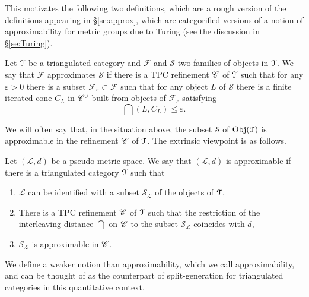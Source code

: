This motivates the following two definitions, which are a rough version of the definitions appearing in \S\ref{se:approx}, which are categorified versions of a notion of approximability for metric groups due to Turing \cite{Turing:approx} (see the discussion in \S\ref{se:Turing}).
\begin{dfn}
    Let $\mathcal{T}$ be a triangulated category and $\mathcal{F}$ and $\mathcal{S}$ two families of objects in $\mathcal{T}$. We say that $\mathcal{F}$ approximates $\mathcal{S}$ if there is a TPC refinement ${\mathscr{C}}$ of $\mathcal{T}$ such that for any $\varepsilon>0$ there is a  subset $\mathcal{F}_\varepsilon\subset \mathcal{F}$ such that for any object $L$ of $\mathcal{S}$ there is a finite iterated cone $C_L$ in ${\mathscr{C}}^0$ built from objects of $\mathcal{F}_\varepsilon$ satisfying $$\dint(L,C_L)\leq \varepsilon.$$ 
\end{dfn}
We will often say that, in the situation above, the subset $\mathcal{S}$ of $\text{Obj}(\mathcal{T})$ is approximable in the refinement ${\mathscr{C}}$ of $\mathcal{T}$.
The extrinsic viewpoint is as follows.
\begin{dfn}\label{intro:defapprox2}
    Let $(\mathcal{L}, d)$ be a pseudo-metric space. We say that $(\mathcal{L}, d)$ is approximable if there is a triangulated category $\mathcal{T}$ such that 
    \begin{enumerate}
    \item $\mathcal{L}$ can be identified with a subset $\mathcal{S}_\mathcal{L}$ of the objects of $\mathcal{T}$,
    \item There is a TPC refinement ${\mathscr{C}}$ of $\mathcal{T}$ such that the restriction of the interleaving distance $\dint$ on ${\mathscr{C}}$ to the subset $\mathcal{S}_\mathcal{L}$ coincides with $d$,
    \item $\mathcal{S}_\mathcal{L}$ is approximable in ${\mathscr{C}}$.
    \end{enumerate}
\end{dfn}

\noindent We define a weaker notion than approximability, which we call  approximability, and can be thought of as the counterpart of split-generation for triangulated categories in this quantitative context.

